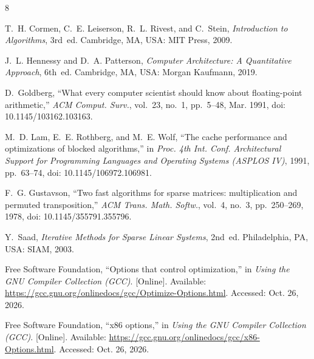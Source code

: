 \documentclass[11pt,a4paper]{article}
\begin{document}
{\footnotesize
\begin{thebibliography}{8}
\setlength{\itemsep}{0pt}\setlength{\parsep}{0pt}

T.~H. Cormen, C.~E. Leiserson, R.~L. Rivest, and C.~Stein, \textit{Introduction to
Algorithms}, 3rd~ed. Cambridge, MA, USA: MIT Press, 2009.

J.~L. Hennessy and D.~A. Patterson, \textit{Computer Architecture: A Quantitative
Approach}, 6th~ed. Cambridge, MA, USA: Morgan Kaufmann, 2019.

D.~Goldberg, ``What every computer scientist should know about floating-point
arithmetic,'' \textit{ACM Comput. Surv.}, vol.~23, no.~1, pp.~5--48, Mar. 1991,
doi: 10.1145/103162.103163.

M.~D. Lam, E.~E. Rothberg, and M.~E. Wolf, ``The cache performance and optimizations of
blocked algorithms,'' in \textit{Proc. 4th Int. Conf. Architectural Support for
Programming Languages and Operating Systems (ASPLOS IV)}, 1991, pp.~63--74,
doi: 10.1145/106972.106981.

F.~G. Gustavson, ``Two fast algorithms for sparse matrices: multiplication and permuted
transposition,'' \textit{ACM Trans. Math. Softw.}, vol.~4, no.~3, pp.~250--269, 1978,
doi: 10.1145/355791.355796.

Y.~Saad, \textit{Iterative Methods for Sparse Linear Systems}, 2nd~ed. Philadelphia, PA,
USA: SIAM, 2003.

Free Software Foundation, ``Options that control optimization,'' in \textit{Using the GNU
Compiler Collection (GCC)}. [Online]. Available:
\url{https://gcc.gnu.org/onlinedocs/gcc/Optimize-Options.html}. Accessed: Oct. 26, 2026.

Free Software Foundation, ``x86 options,'' in \textit{Using the GNU Compiler Collection
(GCC)}. [Online]. Available: \url{https://gcc.gnu.org/onlinedocs/gcc/x86-Options.html}.
Accessed: Oct. 26, 2026.

\end{thebibliography}
}
\end{document}
